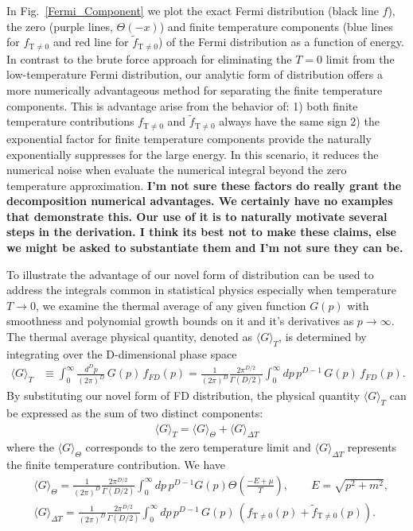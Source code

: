 \documentclass[sn-mathphys,Numbered]{sn-jnl}
\begin{document}
 In Fig.~\ref{Fermi_Component} we plot the exact Fermi distribution (black line $f$), the zero (purple lines, $\Theta(-x)$) and finite temperature components (blue lines for $f_\mathrm{T\neq0}$ and red line for $\widetilde f_\mathrm{T\neq0}$) of the Fermi distribution as a function of energy.
In contrast to the brute force approach for eliminating the $T=0$ limit from the low-temperature Fermi distribution, our analytic form of distribution offers a more numerically advantageous method for separating the finite temperature components. This is advantage arise from the behavior of: 1) both finite temperature contributions $f_\mathrm{T\neq0}$ and $\widetilde f_\mathrm{T\neq0}$ always have the same sign 2) the exponential factor for finite temperature components provide the naturally exponentially suppresses for the large energy. In this scenario, it reduces the numerical noise when evaluate the numerical integral beyond the zero temperature approximation. {\bf I'm not sure these factors do really grant the decomposition numerical advantages.  We certainly have no examples that demonstrate this.  Our use of it is to naturally motivate several steps in the derivation.  I think its best not to make these claims, else we might be asked to substantiate them and I'm not sure they can be.}

To illustrate the advantage of our novel form of distribution can be used to address the integrals common in statistical physics especially when temperature $T\to0$, we examine the thermal average of any given function $G(p)$ with smoothness and polynomial growth bounds on it and it's derivatives as $p\to \infty$. The thermal average physical quantity, denoted as $\langle G\rangle_T$, is determined by integrating over the D-dimensional phase space 
\begin{align}\label{eq:avg_G_T}
\langle G\rangle_T&\equiv\int^{\infty}_{0}\!\!\frac{d^Dp}{(2\pi)^D}\,G(p)\,f_{FD}(p)=\frac{1}{(2\pi)^D}\frac{2\pi^{D/2}}{\Gamma(D/2)}\int^{\infty}_{0}\!\!dp\,p^{D-1}\,G(p)\,f_{FD}(p).
\end{align}
By substituting our novel form of FD distribution, the physical quantity $\langle G\rangle_T$ can be expressed as the sum of two distinct components:
\begin{align}
\langle G\rangle_T=\langle G\rangle_{\Theta}+\langle G\rangle_{\Delta T}
\end{align}
 where the $\langle G\rangle_{\Theta}$ corresponds to the zero temperature limit and $\langle G\rangle_{\Delta T}$ represents the finite temperature contribution. We have
\begin{align}
&\langle G\rangle_{\Theta}=\frac{1}{(2\pi)^D}\frac{2\pi^{D/2}}{\Gamma(D/2)}\int^{\infty}_{0}\!\!dp\,p^{D-1}G(p)\Theta\left(\frac{-E+\mu}{T}\right),\qquad E=\sqrt{p^2+m^2},\\
&\langle G\rangle_{\Delta T}=\frac{1}{(2\pi)^D}\frac{2\pi^{D/2}}{\Gamma(D/2)}\int^{\infty}_{0}\!\!dp\,p^{D-1}\,G(p)\,\left(f_\mathrm{T\neq0}(p)+\widetilde f_\mathrm{T\neq0}(p)\right).\label{G_deltaT}
\end{align}
\end{document}

